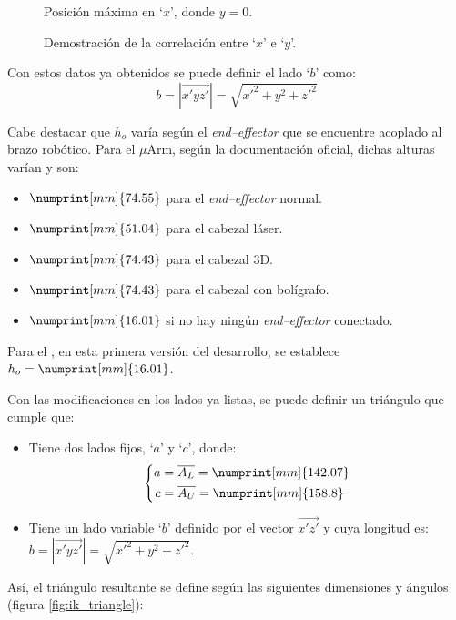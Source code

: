 \begin{figure}[H]
\begin{minipage}{.45\linewidth}
        \caption{Posición máxima en `$x$', donde $y = 0$.}
    \end{minipage}
    \caption{Demostración de la correlación entre `$x$' e `$y$'.}
    \label{fig:arm_limits}
\end{figure}

Con estos datos ya obtenidos se puede definir el lado `$b$' como:
\begin{equation*}
    b = \left|\overrightarrow{x'yz'}\right| = \sqrt{x'^2 + y^2 + z'^2}
\end{equation*}

Cabe destacar que $h_o$ varía según el \textit{end--effector} que se encuentre acoplado
al brazo robótico. Para el $\mu$Arm, según la documentación oficial, dichas alturas varían
y son\cite{UArmDeveloperSwiftProForArduino}:
\begin{itemize}
    \item $\numprint[mm]{74.55}$ para el \textit{end--effector} normal.
    \item $\numprint[mm]{51.04}$ para el cabezal láser.
    \item $\numprint[mm]{74.43}$ para el cabezal 3D.
    \item $\numprint[mm]{74.43}$ para el cabezal con bolígrafo.
    \item $\numprint[mm]{16.01}$ si no hay ningún \textit{end--effector} conectado.
\end{itemize}

Para el \pArm{}, en esta primera versión del desarrollo, se establece $h_o = \numprint[mm]{16.01}$.

Con las modificaciones en los lados ya listas, se puede definir un triángulo que cumple que:
\begin{itemize}
    \item Tiene dos lados fijos, `$a$' y `$c$', donde:
    \begin{equation*}
        \left\{\begin{aligned}
            a &= \overline{A_L} = \numprint[mm]{142.07} \\
            c &= \overline{A_U} = \numprint[mm]{158.8}
        \end{aligned}\right.
    \end{equation*}
    \item Tiene un lado variable `$b$' definido por el vector $\overrightarrow{x'z'}$
    y cuya longitud es: $b = \left|\overrightarrow{x'yz'}\right| = \sqrt{x'^2 + y^2 + z'^2}$.
\end{itemize}
Así, el triángulo resultante se define según las siguientes dimensiones y ángulos (figura
\ref{fig:ik_triangle}):

